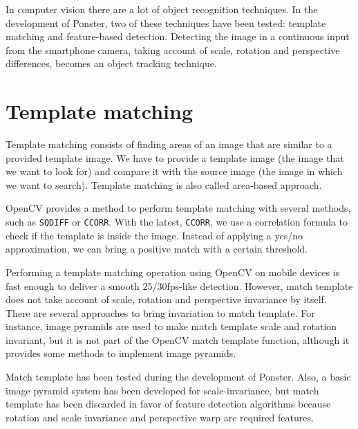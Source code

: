 In computer vision there are a lot of object recognition techniques. In the
development of Ponster, two of these techniques have been tested: template
matching and feature-based detection. Detecting the image in a continuous input from
the smartphone camera, taking account of scale, rotation and perspective
differences, becomes an object tracking technique. 

\section{Template matching}
Template matching\cite{ocv01} consists of finding areas of an image that are similar to a
provided template image. We have to provide a template image (the image that we want
to look for) and compare it with the source image (the image in which we want to
search)\cite{tmatch01}. Template matching is also called area-based approach.

OpenCV provides a method to perform template matching with several methods, such as
\texttt{SQDIFF} or \texttt{CCORR}. With the latest, \texttt{CCORR}, we use a
correlation formula to check if the template is inside the image. Instead of
applying a yes/no approximation, we can bring a positive match with a certain
threshold. 


Performing a template matching operation using OpenCV on mobile devices is fast
enough to deliver a smooth 25/30fps-like detection. However, match template does not
take account of scale, rotation and perspective invariance by itself. There are
several approaches to bring invariation to match template. For instance, image
pyramids are used to make match template scale and rotation
invariant\cite{4368176}, but it is not part of the OpenCV match template function, although it
provides some methods to implement image pyramids\cite{ocv02}. 

Match template has been tested during the development of Ponster. Also, a basic
image pyramid system has been developed for scale-invariance, but match template has
been discarded in favor of feature detection algorithms because rotation and scale
invariance and perspective warp are required features.

